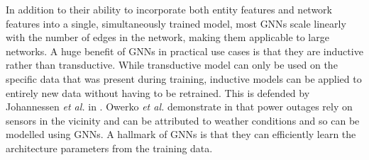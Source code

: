 \documentclass{report} %
\begin{document}
In addition to their ability to incorporate both entity features and network features into a single, simultaneously trained model, most \ac{GNN}s scale linearly with 
the number of edges in the network, making them applicable to large networks. A huge benefit of \ac{GNN}s in practical use cases is that they are inductive rather 
than transductive. While transductive model can only be used on the specific data that was present during training, inductive models can be applied to entirely new 
data without having to be retrained. This is defended by Johannessen \textit{et al.} in \cite{ML HGNN-2023}.
Owerko \textit{et al.} demonstrate in \cite{PO GNN-2018} that power outages rely on sensors in the vicinity and can be attributed to weather conditions 
and so can be modelled using \ac{GNN}s. A hallmark of \ac{GNN}s is that they can efficiently learn the architecture parameters from the training data.
\end{document}
